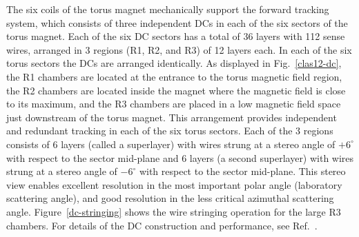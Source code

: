 \documentclass[final,3p,twocolumn]{elsarticle}
\begin{document}
The six coils of the torus magnet mechanically support the forward tracking system, which consists of three
independent DCs in each of the six sectors of the torus magnet. Each of the six DC sectors has a total of 36
layers with 112 sense wires, arranged in 3 regions (R1, R2, and R3) of 12 layers each. In each of the six torus
sectors the DCs are arranged identically. As displayed in Fig.~\ref{clas12-dc}, the R1 chambers are located at
the entrance to the torus magnetic field region, the R2 chambers are located inside the magnet where the
magnetic field is close to its maximum, and the R3 chambers are placed in a low magnetic field space just
downstream of the torus magnet. This arrangement provides independent and redundant tracking in each of the
six torus sectors. Each of the 3 regions consists of 6 layers (called a superlayer) with wires strung at a stereo
angle of $+6^\circ$ with respect to the sector mid-plane and 6 layers (a second superlayer) with wires strung at
a stereo angle of $-6^\circ$ with respect to the sector mid-plane. This stereo view enables excellent resolution in
the most important polar angle (laboratory scattering angle), and good resolution in the less critical azimuthal
scattering angle. Figure~\ref{dc-stringing} shows the wire stringing operation for the large R3 chambers. For
details of the DC construction and performance, see Ref.~\cite{DC}.
\end{document}
